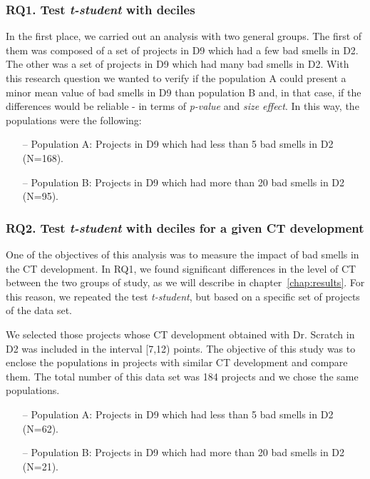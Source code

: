 \subsubsection{RQ1. Test \textit{t-student} with deciles}
\label{subsubsec:rq1_t_student_deciles}

In the first place, we carried out an analysis with two general groups. The first of them was composed of a set of projects in D9 which had a few bad smells in D2. The other was a set of projects in D9 which had many bad smells in D2. With this research question we wanted to verify if the population A could present a minor mean value of bad smells in D9 than population B and, in that case, if the differences would be reliable - in terms of \textit{p-value} and \textit{size effect}. In this way, the populations were the following:

\begin{itemize}
    \item[--] Population A: Projects in D9 which had less than 5 bad smells in D2 (N=168).
    \item[--] Population B: Projects in D9 which had more than 20 bad smells in D2 (N=95).
\end{itemize}


\subsubsection{RQ2. Test \textit{t-student} with deciles for a given CT development}
\label{subsubsec:rq2_t_student_deciles_ct}

One of the objectives of this analysis was to measure the impact of bad smells in the CT development. In RQ1, we found significant differences in the level of CT between the two groups of study, as we will describe in chapter~\ref{chap:results}. For this reason, we repeated the test \textit{t-student}, but based on a specific set of projects of the data set. 

We selected those projects whose CT development obtained with Dr. Scratch in D2 was included in the interval [7,12) points. The objective of this study was to enclose the populations in projects with similar CT development and compare them. The total number of this data set was 184 projects and we chose the same populations.

\begin{itemize}
    \item[--] Population A: Projects in D9 which had less than 5 bad smells in D2 (N=62).
    \item[--] Population B: Projects in D9 which had more than 20 bad smells in D2 (N=21).
\end{itemize}


